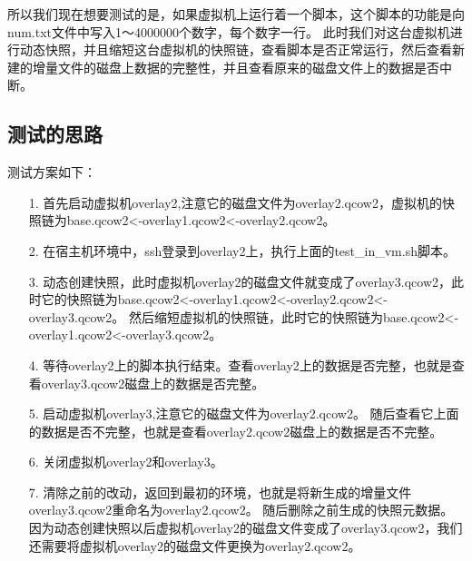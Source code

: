 \documentclass[a4paper,left=1.5cm,right=1.5cm,11pt]{article}
\begin{document}
	所以我们现在想要测试的是，如果虚拟机上运行着一个脚本，这个脚本的功能是向num.txt文件中写入1～4000000个数字，每个数字一行。
	此时我们对这台虚拟机进行动态快照，并且缩短这台虚拟机的快照链，查看脚本是否正常运行，然后查看新建的增量文件的磁盘上数据的完整性，并且查看原来的磁盘文件上的数据是否中断。\par

\subsection{测试的思路}
	测试方案如下：
	\begin{itemize}
		\item[1.] 首先启动虚拟机overlay2,注意它的磁盘文件为overlay2.qcow2，虚拟机的快照链为base.qcow2<-overlay1.qcow2<-overlay2.qcow2。
		\item[2.] 在宿主机环境中，ssh登录到overlay2上，执行上面的test\_in\_vm.sh脚本。
		\item[3.] 动态创建快照，此时虚拟机overlay2的磁盘文件就变成了overlay3.qcow2，此时它的快照链为base.qcow2<-overlay1.qcow2<-overlay2.qcow2<-overlay3.qcow2。
				  然后缩短虚拟机的快照链，此时它的快照链为base.qcow2<-overlay1.qcow2<-overlay3.qcow2。
		\item[4.] 等待overlay2上的脚本执行结束。查看overlay2上的数据是否完整，也就是查看overlay3.qcow2磁盘上的数据是否完整。
		\item[5.] 启动虚拟机overlay3,注意它的磁盘文件为overlay2.qcow2。
				  随后查看它上面的数据是否不完整，也就是查看overlay2.qcow2磁盘上的数据是否不完整。
		\item[6.] 关闭虚拟机overlay2和overlay3。
		\item[7.] 清除之前的改动，返回到最初的环境，也就是将新生成的增量文件overlay3.qcow2重命名为overlay2.qcow2。
		          随后删除之前生成的快照元数据。因为动态创建快照以后虚拟机overlay2的磁盘文件变成了overlay3.qcow2，我们还需要将虚拟机overlay2的磁盘文件更换为overlay2.qcow2。
	\end{itemize}
\end{document}
